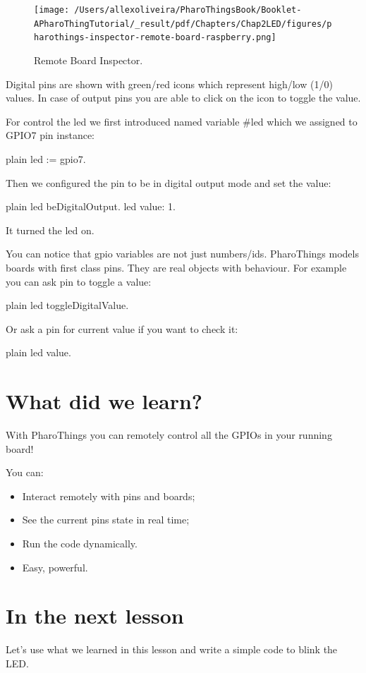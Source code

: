 \documentclass[10pt,twoside,english]{_support/latex/sbabook/sbabook}
\begin{document}
\begin{figure}

\begin{center}
\texttt{[image: /Users/allexoliveira/PharoThingsBook/Booklet-APharoThingTutorial/\_result/pdf/Chapters/Chap2LED/figures/pharothings-inspector-remote-board-raspberry.png]}\caption{Remote Board Inspector.\label{remoteBoard}}\end{center}
\end{figure}


Digital pins are shown with green/red icons which represent high/low (1/0) values. In case of output pins you are able to click on the icon to toggle the value.

For control the led we first introduced named variable \#led which we assigned to GPIO7 pin instance:

\begin{displaycode}{plain}
led := gpio7.
\end{displaycode}

Then we configured the pin to be in digital output mode and set the value:

\begin{displaycode}{plain}
led beDigitalOutput.
led value: 1.
\end{displaycode}

It turned the led on.

You can notice that gpio variables are not just numbers/ids. PharoThings models boards with first class pins. They are real objects with behaviour. For example you can ask pin to toggle a value:

\begin{displaycode}{plain}
led toggleDigitalValue.
\end{displaycode}

Or ask a pin for current value if you want to check it:

\begin{displaycode}{plain}
led value.
\end{displaycode}
\section{What did we learn?}
With PharoThings you can remotely control all the GPIOs in your running board!

You can:

\begin{itemize}
\item Interact remotely with pins and boards;
\item See the current pins state in real time;
\item Run the code dynamically.
\item Easy, powerful.
\end{itemize}
\section{In the next lesson}
Let’s use what we learned in this lesson and write a simple code to blink the LED.


\backmatter

\end{document}
